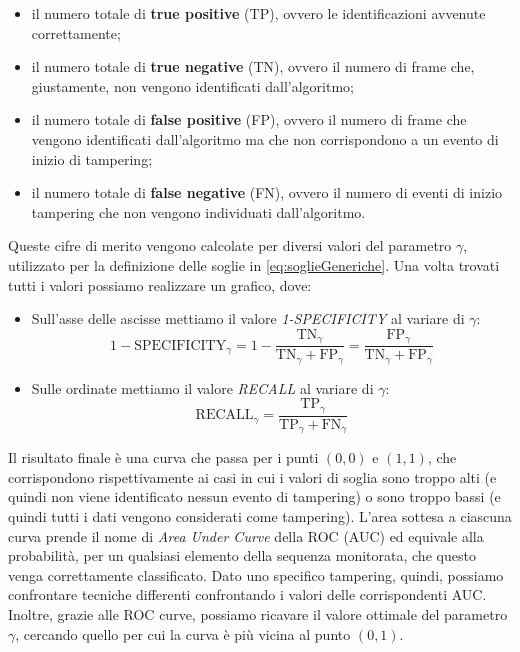 \begin{itemize}
	\item il numero totale di \textbf{true positive} (TP), ovvero le identificazioni avvenute correttamente;
	\item il numero totale di \textbf{true negative} (TN), ovvero il numero di frame che, giustamente, non vengono identificati dall'algoritmo;
	\item il numero totale di \textbf{false positive} (FP), ovvero il numero di frame che vengono identificati dall'algoritmo ma che non corrispondono a un evento di inizio di tampering;
	\item il numero totale di \textbf{false negative} (FN), ovvero il numero di eventi di inizio tampering che non vengono individuati dall'algoritmo.
\end{itemize}
Queste cifre di merito vengono calcolate per diversi valori del parametro $\gamma$, utilizzato per la definizione delle soglie in \eqref{eq:soglieGeneriche}.
Una volta trovati tutti i valori possiamo realizzare un grafico, dove:
\begin{itemize}
	\item Sull'asse delle ascisse mettiamo il valore \textit{1-SPECIFICITY} al variare di $\gamma$:
	\[1-\text{SPECIFICITY}_\gamma = 1-\frac{\text{TN}_\gamma}{\text{TN}_\gamma+\text{FP}_\gamma}=\frac{\text{FP}_\gamma}{\text{TN}_\gamma+\text{FP}_\gamma}\]
	\item Sulle ordinate mettiamo il valore \textit{RECALL} al variare di $\gamma$:
	\[\text{RECALL}_\gamma=\frac{\text{TP}_\gamma}{\text{TP}_\gamma+\text{FN}_\gamma} \]
\end{itemize}
Il risultato finale \`e una curva che passa per i punti $(0,0)$ e $(1,1)$, che corrispondono rispettivamente ai casi in cui i valori di soglia sono troppo alti (e quindi non viene identificato nessun evento di tampering) o sono troppo bassi (e quindi tutti i dati vengono considerati come tampering).
L'area sottesa a ciascuna curva prende il nome di \textit{Area Under Curve} della ROC (AUC) ed equivale alla probabilit\`a, per un qualsiasi elemento della sequenza monitorata, che questo venga correttamente classificato.  
Dato uno specifico tampering, quindi, possiamo confrontare tecniche differenti confrontando i valori delle corrispondenti AUC.
Inoltre, grazie alle ROC curve, possiamo ricavare il valore ottimale del parametro $\gamma$, cercando quello per cui la curva \`e pi\`u vicina al punto $(0,1)$.
